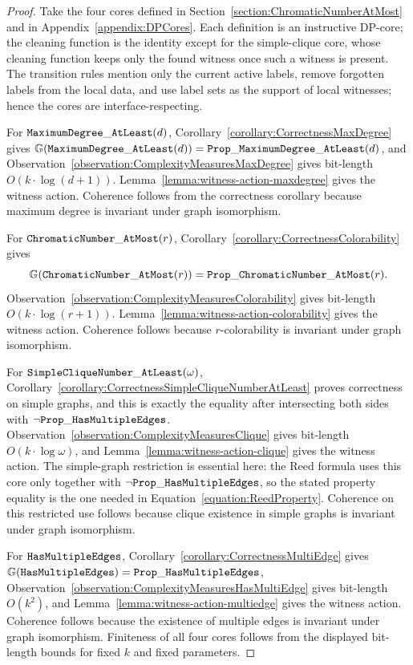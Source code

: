 \documentclass[11pt,a4paper]{article}
\newcommand{\treewidthvalue}{k}
\newcommand{\dpcoregraphproperty}[1]{\mathbb{G}(#1)}
\newcommand{\dpNamePart}[1]{\mbox{\normalfont\ttfamily #1}}
\newcommand{\hasMultiEdgeProperty}{\dpNamePart{Prop}\_\allowbreak\dpNamePart{HasMultipleEdges}}
\newcommand{\maxDegreeAtLeastProperty}[1]{\dpNamePart{Prop}\_\allowbreak\dpNamePart{MaximumDegree}\_\allowbreak\dpNamePart{AtLeast}(#1)}
\newcommand{\chromaticNumberAtMostProperty}[1]{\dpNamePart{Prop}\_\allowbreak\dpNamePart{ChromaticNumber}\_\allowbreak\dpNamePart{AtMost}(#1)}
\newcommand{\hasMultiEdgeCore}{\dpNamePart{HasMultipleEdges}}
\newcommand{\simpleCliqueNumberAtLeastCore}[1]{\dpNamePart{SimpleCliqueNumber}\_\allowbreak\dpNamePart{AtLeast}(#1)}
\newcommand{\maxDegreeAtLeastCore}[1]{\dpNamePart{MaximumDegree}\_\allowbreak\dpNamePart{AtLeast}(#1)}
\newcommand{\numbercolors}{r}
\newcommand{\chromaticnumberAtMostCore}[1]{\dpNamePart{ChromaticNumber}\_\allowbreak\dpNamePart{AtMost}(#1)}
\newcommand{\cliqueparameter}{\omega}
\newcommand{\maxdegreeparameter}{d}
\begin{document}
\begin{proof}
Take the four cores defined in Section~\ref{section:ChromaticNumberAtMost} and in Appendix~\ref{appendix:DPCores}. Each definition is an instructive DP-core; the cleaning function is the identity except for the simple-clique core, whose cleaning function keeps only the found witness once such a witness is present. The transition rules mention only the current active labels, remove forgotten labels from the local data, and use label sets as the support of local witnesses; hence the cores are interface-respecting.

For $\maxDegreeAtLeastCore{\maxdegreeparameter}$, Corollary~\ref{corollary:CorrectnessMaxDegree} gives
$\dpcoregraphproperty{\maxDegreeAtLeastCore{\maxdegreeparameter}}=\maxDegreeAtLeastProperty{\maxdegreeparameter}$, and Observation~\ref{observation:ComplexityMeasuresMaxDegree} gives bit-length $O(\treewidthvalue\cdot\log(\maxdegreeparameter+1))$. Lemma~\ref{lemma:witness-action-maxdegree} gives the witness action. Coherence follows from the correctness corollary because maximum degree is invariant under graph isomorphism.

For $\chromaticnumberAtMostCore{\numbercolors}$, Corollary~\ref{corollary:CorrectnessColorability} gives
\[
\dpcoregraphproperty{\chromaticnumberAtMostCore{\numbercolors}}
= \chromaticNumberAtMostProperty{\numbercolors}.
\]
Observation~\ref{observation:ComplexityMeasuresColorability} gives bit-length $O(\treewidthvalue\cdot\log(\numbercolors+1))$. Lemma~\ref{lemma:witness-action-colorability} gives the witness action. Coherence follows because $\numbercolors$-colorability is invariant under graph isomorphism.

For $\simpleCliqueNumberAtLeastCore{\cliqueparameter}$, Corollary~\ref{corollary:CorrectnessSimpleCliqueNumberAtLeast} proves correctness on simple graphs, and this is exactly the equality after intersecting both sides with $\neg\hasMultiEdgeProperty$. Observation~\ref{observation:ComplexityMeasuresClique} gives bit-length $O(\treewidthvalue\cdot\log\cliqueparameter)$, and Lemma~\ref{lemma:witness-action-clique} gives the witness action. The simple-graph restriction is essential here: the Reed formula uses this core only together with $\neg\hasMultiEdgeProperty$, so the stated property equality is the one needed in Equation~\eqref{equation:ReedProperty}. Coherence on this restricted use follows because clique existence in simple graphs is invariant under graph isomorphism.

For $\hasMultiEdgeCore$, Corollary~\ref{corollary:CorrectnessMultiEdge} gives
$\dpcoregraphproperty{\hasMultiEdgeCore}=\hasMultiEdgeProperty$, Observation~\ref{observation:ComplexityMeasuresHasMultiEdge} gives bit-length $O(\treewidthvalue^2)$, and Lemma~\ref{lemma:witness-action-multiedge} gives the witness action. Coherence follows because the existence of multiple edges is invariant under graph isomorphism. Finiteness of all four cores follows from the displayed bit-length bounds for fixed $\treewidthvalue$ and fixed parameters.
\end{proof}
\end{document}
